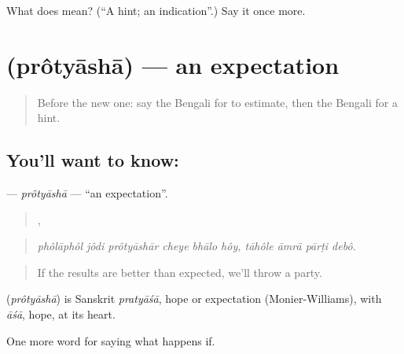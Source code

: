\begin{tcolorbox}[breakable,colback=teal!4,colframe=teal!35!black,title={Before you move on}]
What does  mean? (\textquotedblleft{}A hint; an indication\textquotedblright{}.) Say it once more.
\end{tcolorbox}
\section[\texorpdfstring{\bn{প্রত্যাশা} (prôtyāshā)}{প্রত্যাশা (prôtyāshā)}]{ (prôtyāshā) — an expectation}

\label{lesson:BN-C367-protyasha}



\begin{quote}
Before the new one: say the Bengali for to estimate, then the Bengali for a hint.
\end{quote}

\subsection*{You'll want to know: }
\textbf{} — \emph{prôtyāshā} — \textquotedblleft{}an expectation\textquotedblright{}.

\begin{quote}
     ,    
\end{quote}

\begin{quote}
\emph{phôlāphôl jôdi prôtyāshār cheye bhālo hôy, tāhôle āmrā pārṭi debô.}
\end{quote}

\begin{quote}
If the results are better than expected, we'll throw a party.
\end{quote}

\begin{cousinweb}
\textbf{} (\emph{prôtyāshā}) is Sanskrit \emph{pratyāśā}, hope or expectation (Monier-Williams), with \emph{āśā}, hope, at its heart.
\end{cousinweb}

\begin{grammarlens}[title={What you've built}]
One more word for saying what happens if.
\end{grammarlens}

